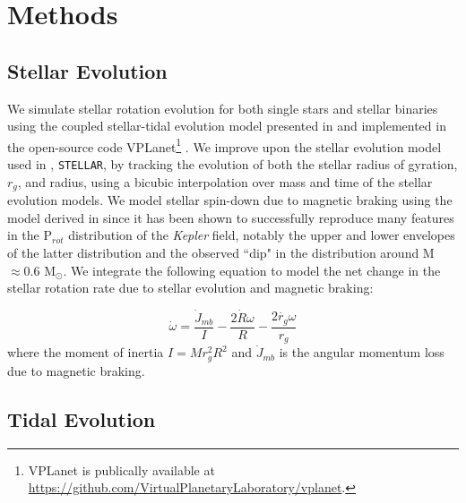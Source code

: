 \documentclass[twocolumn]{aastex61}
\newcommand{\stellar}[0]{\texttt{STELLAR}\xspace}
\begin{document}
 

\section{Methods} \label{sec:methods}

\subsection{Stellar Evolution} \label{sec:methods:stellar}

We simulate stellar rotation evolution for both single stars and stellar binaries using the coupled stellar-tidal evolution model presented in \citet{Fleming2018} and implemented in the open-source code VPLanet\footnote{VPLanet is publically available
at \href{https://github.com/VirtualPlanetaryLaboratory/vplanet}{{https://github.com/VirtualPlanetaryLaboratory/vplanet}}.} \citep[][Barnes et al., in prep]{Barnes2016}. We improve upon the stellar evolution model used in \citet{Fleming2018}, \stellar, by tracking the evolution of both the stellar radius of gyration, $r_g$, and radius, using a bicubic interpolation over mass and time of the \citet{Baraffe2015} stellar evolution models. We model stellar spin-down due to magnetic braking using the model derived in \citet{Matt2015} since it has been shown to successfully reproduce many features in the P$_{rot}$ distribution of the \textit{Kepler} field, notably the upper and lower envelopes of the latter distribution and the observed ``dip" in the distribution around M${\approx}0.6$ M$_{\odot}$. We integrate the following equation to model the net change in the stellar rotation rate due to stellar evolution and magnetic braking: 

\begin{equation} \label{eqn:stellar_rot_rate_dt}
\dot{\omega} = \frac{\dot{J}_{mb}}{I} - \frac{2 \dot{R} \omega}{R} - \frac{2 \dot{r_g} \omega}{r_g}
\end{equation}
where the moment of inertia $I = M r_g^2 R^2$ and $\dot{J}_{mb}$ is the angular momentum loss due to magnetic braking.  

\subsection{Tidal Evolution} \label{sec:methods:eqtide}
\end{document}
